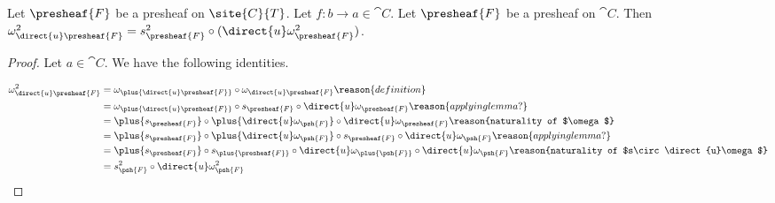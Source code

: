 \begin{lemma}
Let $\presheaf{F}$ be a presheaf on $\site{C}{T}$.
Let $f:b\rightarrow a \in \cat{C}$.
Let $\presheaf{F}$ be a presheaf on $\cat{C}$.
Then $\omega^2_{\direct{u} \presheaf{F}} = s^2_{\presheaf{F}} \circ (\direct{u} \omega^2_{\presheaf{F}})$.
\end{lemma}

\begin{proof}
Let $a\in \cat{C}$.
We have the following identities.

\begin{align*}
	\omega^2_{\direct{u} \presheaf{F}} 
		&= \omega_{\plus{\direct{u} \presheaf{F}}} \circ \omega_{\direct{u} \presheaf{F}}
		\reason{definition} \\
		&= \omega_{\plus{\direct{u} \presheaf{F}}} \circ s_{\presheaf{F}} \circ \direct{u}\omega_{\presheaf{F}}
		\reason{applying lemma ?} \\
		&= \plus{s_{\presheaf{F}}} \circ \plus{\direct{u}\omega_{\psh{F}}} \circ \direct{u}\omega_{\presheaf{F}}
		\reason{naturality of $\omega$} \\
		&= \plus{s_{\presheaf{F}}} \circ \plus{\direct{u}\omega_{\psh{F}}} \circ
		s_{\presheaf{F}} \circ \direct{u}\omega_{\psh{F}}
		\reason{applying lemma ?} \\
		&= \plus{s_{\presheaf{F}}} \circ s_{\plus{\presheaf{F}}} \circ \direct{u}\omega_{\plus{\psh{F}}} \circ \direct{u}\omega_{\psh{F}}
		\reason{naturality of $s\circ \direct{u}\omega$}\\
		&= s^2_{\psh{F}} \circ \direct{u}\omega^2_{\psh{F}}\\
\end{align*}

\end{proof}